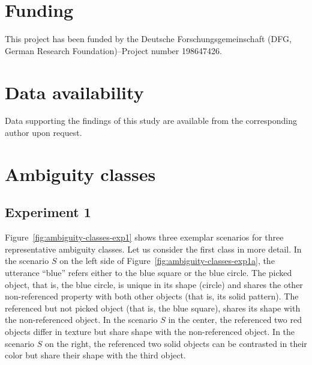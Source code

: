 \documentclass[11pt,a4paper]{article}
\begin{document}





\section*{Funding}

This project has been funded by the Deutsche Forschungsgemeinschaft (DFG, German Research Foundation)--Project number 198647426. 

\section*{Data availability}
Data supporting the findings of this study are available from the corresponding author upon request.


\setlength{\bibleftmargin}{.125in}
\setlength{\bibindent}{-\bibleftmargin}



\cleardoublepage

\appendix

\section{Ambiguity classes}

\subsection*{Experiment 1}

Figure~\ref{fig:ambiguity-classes-exp1} shows three exemplar scenarios for three representative ambiguity classes. 
Let us consider the first class in more detail.
In the scenario $S$ on the left side of Figure~\ref{fig:ambiguity-classes-exp1a}, 
the utterance ``blue'' refers either to the blue square or the blue circle.
The picked object, that is, the blue circle, is unique in its shape (circle) and shares the other non-referenced property with both other objects (that is, its solid pattern). 
The referenced but not picked object (that is, the blue square), shares its shape with the non-referenced object. 
In the scenario $S$ in the center, the referenced two red objects differ in texture but share shape with the non-referenced object.
In the scenario $S$ on the right, the referenced two solid objects can be contrasted in their color but share their shape with the third object.
\end{document}
